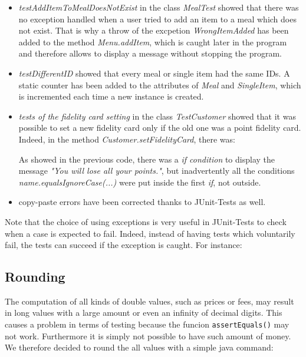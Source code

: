 \begin{itemize}
	\item{\textit{testAddItemToMealDoesNotExist}} in the class \textit{MealTest} showed that there was no exception handled when a user tried to add an item to a meal which does not exist. That is why a throw of the excpetion \textit{WrongItemAdded} has been added to the method \textit{Menu.addItem}, which is caught later in the program and therefore allows to display a message without stopping the program.
	\item{\textit{testDifferentID}} showed that every meal or single item had the same IDs. A static counter has been added to the attributes of \textit{Meal} and \textit{SingleItem}, which is incremented each time a new instance is created.
	\item{\textit{tests of the fidelity card setting}} in the class \textit{TestCustomer} showed that it was possible to set a new fidelity card only if the old one was a point fidelity card. Indeed, in the method \textit{Customer.setFidelityCard}, there was:

As showed in the previous code, there was a \textit{if condition} to display the message \textit{"You will lose all your points."}, but inadvertently all the conditions \textit{name.equalsIgnoreCase(...)} were put inside the first \textit{if}, not outside.
	\item{} copy-paste errors have been corrected thanks to JUnit-Tests as well.
\end{itemize}
Note that the choice of using exceptions is very useful in JUnit-Tests to check when a case is expected to fail. Indeed, instead of having tests which voluntarily fail, the tests can succeed if the exception is caught. For instance:


\subsection{Rounding}
\label{sub:rounding}

The computation of all kinds of double values, such as prices or fees, may result in long 
values with a large amount or even an infinity of decimal digits. This causes a problem in 
terms of testing because the funcion \lstinline|assertEquals()| may not work. Furthermore 
it is simply not possible to have such amount of money. We therefore decided to round the 
all values with a simple java command:


